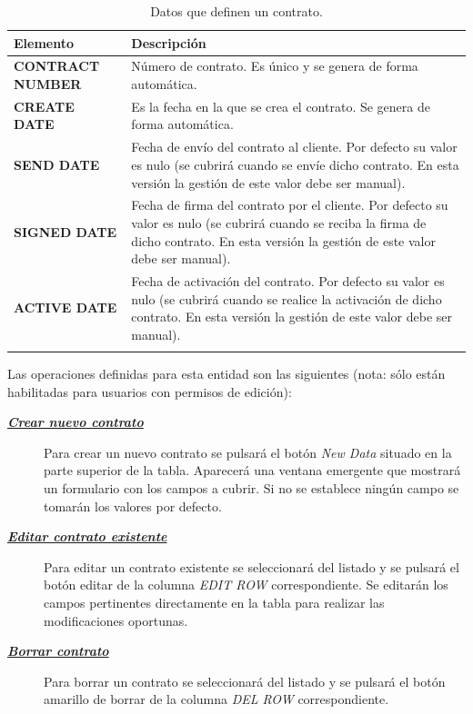 \begin{table}[H]
  \centering
  \setlength{\leftmargini}{0.4cm}
  \resizebox{14cm}{!} {
  \begin{tabular}{|m{3cm} m{11cm}|}
  \rowcolor{udcpink!25}
  \hline
  	\textbf{Elemento} & \textbf{Descripción} \\\hline
	\textbf{CONTRACT NUMBER} & Número de contrato. Es único y se genera de forma automática.   \\
	\textbf{CREATE DATE} & Es la fecha en la que se crea el contrato. Se genera de forma automática. \\
	\textbf{SEND DATE} & Fecha de envío del contrato al cliente. Por defecto su valor es nulo (se cubrirá cuando se envíe dicho contrato. En esta versión la gestión de este valor debe ser manual). \\		
	\textbf{SIGNED DATE} & Fecha de firma del contrato por el cliente. Por defecto su valor es nulo (se cubrirá cuando se reciba la firma de dicho contrato. En esta versión la gestión de este valor debe ser manual). \\	
	\textbf{ACTIVE DATE} & Fecha de activación del contrato. Por defecto su valor es nulo (se cubrirá cuando se realice la activación de dicho contrato. En esta versión la gestión de este valor debe ser manual). \\	
	\\\hline
  \end{tabular}
  } %
  \caption{Datos que definen un contrato.}
  \label{tab:contrato}
\end{table}

Las operaciones definidas para esta entidad son las siguientes (nota: sólo están habilitadas para usuarios con permisos de edición):
\begin{description}
\item[\underline{\textsl{\textbf{Crear nuevo contrato}}}] Para crear un nuevo contrato se pulsará el botón \textit{New Data} situado en la parte superior de la tabla. Aparecerá una ventana emergente que mostrará un formulario con los campos a cubrir. Si no se establece ningún campo se tomarán los valores por defecto.

\item[\underline{\textsl{\textbf{Editar contrato existente}}}] Para editar un contrato existente se seleccionará del listado y se pulsará el botón editar de la columna \textit{EDIT ROW} correspondiente. Se editarán los campos pertinentes directamente en la tabla para realizar las modificaciones oportunas. 

\item[\underline{\textsl{\textbf{Borrar contrato}}}] Para borrar un contrato se seleccionará del listado y se pulsará el botón amarillo de borrar de la columna \textit{DEL ROW} correspondiente.
\end{description}





